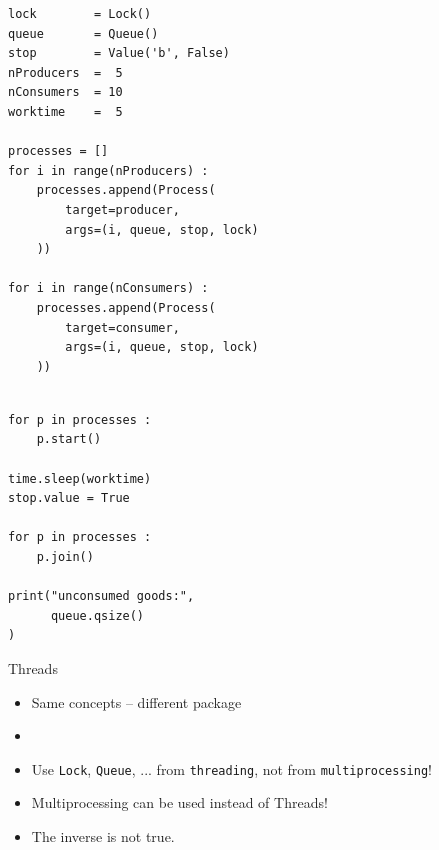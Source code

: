 \begin{frame}[fragile]
%
\begin{tcbraster}[raster columns=2,
                  raster equal height,
                  nobeforeafter,
                  raster column skip=0.5cm]
\begin{codebox}[(... continued)]
\begin{verbatim}
lock        = Lock()
queue       = Queue()
stop        = Value('b', False)
nProducers  =  5
nConsumers  = 10
worktime    =  5

processes = []
for i in range(nProducers) :
    processes.append(Process(
        target=producer,
        args=(i, queue, stop, lock)
    ))

for i in range(nConsumers) :
    processes.append(Process(
        target=consumer,
        args=(i, queue, stop, lock)
    ))
\end{verbatim}
\end{codebox}
%
\begin{codebox}[(... continued)]
\begin{verbatim}
    
for p in processes :
    p.start()
    
time.sleep(worktime)
stop.value = True

for p in processes :
    p.join()

print("unconsumed goods:",
      queue.qsize()
)
\end{verbatim}
\end{codebox}
\end{tcbraster}
%
\end{frame}


\begin{frame}{Threads}
%
\begin{itemize}
\item Same concepts -- different package
\item {}
\item Use \texttt{Lock}, \texttt{Queue}, ... from \texttt{threading}, not from \texttt{multiprocessing}!
\item Multiprocessing can be used instead of Threads!
\item The inverse is not true.
\end{itemize}
%
\end{frame}

